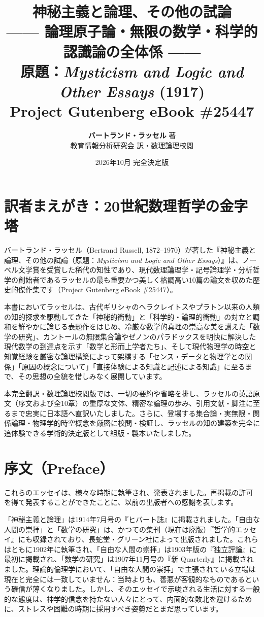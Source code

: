 \documentclass[a4paper,11pt,openany]{ltjsbook}
\title{
    {\huge\bfseries\gtfamily 神秘主義と論理、その他の試論}\\[12pt]
    {\Large\gtfamily —— 論理原子論・無限の数学・科学的認識論の全体係 ——}\\[18pt]
    {\large 原題：\textit{Mysticism and Logic and Other Essays} (1917)}\\[6pt]
    {\normalsize Project Gutenberg eBook \#25447}
}
\author{\textbf{バートランド・ラッセル} 著\\[4pt]教育情報分析研究会 訳・数理論理校閲}
\date{2026年10月 完全決定版}
\begin{document}
\maketitle

\frontmatter

\chapter*{訳者まえがき：20世紀数理哲学の金字塔}

バートランド・ラッセル（Bertrand Russell, 1872--1970）が著した『神秘主義と論理、その他の試論（原題：\textit{Mysticism and Logic and Other Essays}）』は、ノーベル文学賞を受賞した稀代の知性であり、現代数理論理学・記号論理学・分析哲学の創始者であるラッセルの最も重要かつ美しく格調高い10篇の論文を収めた歴史的傑作集です（Project Gutenberg eBook \#25447）。

本書においてラッセルは、古代ギリシャのヘラクレイトスやプラトン以来の人類の知的探求を駆動してきた「神秘的衝動」と「科学的・論理的衝動」の対立と調和を鮮やかに論じる表題作をはじめ、冷厳な数学的真理の崇高な美を讃えた「数学の研究」、カントールの無限集合論やゼノンのパラドックスを明快に解決した現代数学の到達点を示す「数学と形而上学者たち」、そして現代物理学の時空と知覚経験を厳密な論理構築によって架橋する「センス・データと物理学との関係」「原因の概念について」「直接体験による知識と記述による知識」に至るまで、その思想の全貌を惜しみなく展開しています。

本完全翻訳・数理論理校閲版では、一切の要約や省略を排し、ラッセルの英語原文（序文および全10章）の重厚な文体、精密な論理の歩み、引用文献・脚注に至るまで忠実に日本語へ直訳いたしました。さらに、登場する集合論・実無限・関係論理・物理学的時空概念を厳密に校閲・検証し、ラッセルの知の建築を完全に追体験できる学術的決定版として組版・製本いたしました。

\clearpage
\tableofcontents
\clearpage

\mainmatter


\chapter*{序文（Preface）}


これらのエッセイは、様々な時期に執筆され、発表されました。再掲載の許可を得て発表することができたことに、以前の出版者への感謝を表します。

「神秘主義と論理」は1914年7月号の『ヒバート誌』に掲載されました。「自由な人間の崇拝」と「数学の研究」は、かつての集刊（現在は廃版）『哲学的エッセイ』にも収録されており、長蛇堂・グリーン社によって出版されました。これらはともに1902年に執筆され、「自由な人間の崇拝」は1903年版の『独立評論』に最初に掲載され、「数学の研究」は1907年11月号の『新 Quarterly』に掲載されました。理論的倫理学において、「自由な人間の崇拝」で主張されている立場は現在と完全には一致していません：当時よりも、善悪が客観的なものであるという確信が薄くなりました。しかし、そのエッセイで示唆される生活に対する一般的な態度は、神学的信念を持たない人々にとって、内面的な敗北を避けるために、ストレスや困難の時期に採用すべき姿勢だとまだ思っています。
\end{document}

